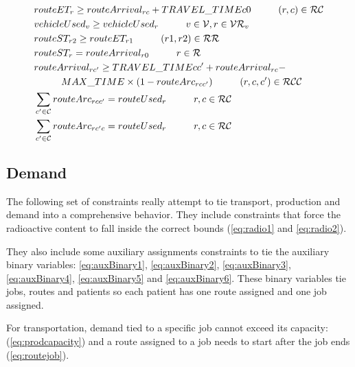 \begin{align}
		& routeET_{r} \ge routeArrival_{rc} + TRAVEL\_TIME{c0}
				\hspace{10mm} (r, c) \in \mathcal{RC}\label{eq:routeET}\\
		& vehicleUsed_{v} \ge vehicleUsed_{r}
				\hspace{10mm} v \in \mathcal{V}, r \in \mathcal{VR}_{v} \label{eq:vehicleUsed}\\
		& routeST_{r2} \ge routeET_{r1}
				\hspace{10mm} (r1, r2) \in \mathcal{RR} \label{eq:consecutiveRoutes}\\
		& routeST_{r} = routeArrival_{r0}
				\hspace{10mm} r \in \mathcal{R}\label{eq:routefirstnode}\\
		& routeArrival_{rc'} \ge TRAVEL\_TIME{cc'} + routeArrival_{rc} - \notag\\ 
		& \hspace{10mm} MAX\_TIME \times (1 - routeArc_{rcc'})
				\hspace{10mm} (r, c, c') \in \mathcal{RCC} \label{eq:cyclecutting}\\
		& \sum_{c' \in \mathcal{C}} routeArc_{rcc'}  = routeUsed_{r}
				\hspace{10mm} r, c \in \mathcal{RC} \label{eq:balance}\\
		& \sum_{c' \in \mathcal{C}} routeArc_{rc'c}  = routeUsed_{r}
				\hspace{10mm} r, c \in \mathcal{RC} \label{eq:balance2}\\				
\end{align}

\subsection{Demand}

The following set of constraints really attempt to tie transport, production and demand into a comprehensive behavior.
They include constraints that force the radioactive content to fall inside the correct bounds (\ref{eq:radio1} and \ref{eq:radio2}).

They also include some auxiliary assignments constraints to tie the auxiliary binary variables: \ref{eq:auxBinary1}, \ref{eq:auxBinary2}, \ref{eq:auxBinary3}, \ref{eq:auxBinary4}, \ref{eq:auxBinary5} and \ref{eq:auxBinary6}. These binary variables tie jobs, routes and patients so each patient has one route assigned and one job assigned.

For transportation, demand tied to a specific job cannot exceed its capacity: (\ref{eq:prodcapacity}) and a route assigned to a job needs to start after the job ends (\ref{eq:routejob}).

